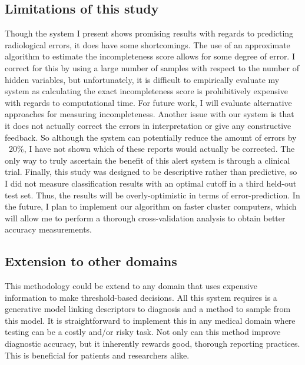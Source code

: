 \subsection{Limitations of this study}
Though the system I present shows promising results with regards to predicting radiological errors, it does have some shortcomings. The use of an approximate algorithm to estimate the incompleteness score allows for some degree of error. I correct for this by using a large number of samples with respect to the number of hidden variables, but unfortunately, it is difficult to empirically evaluate my system as calculating the exact incompleteness score is prohibitively expensive with regards to computational time. For future work, I will evaluate alternative approaches for measuring incompleteness. Another issue with our system is that it does not actually correct the errors in interpretation or give any constructive feedback. So although the system can potentially reduce the amount of errors by  ~20\%, I have not shown which of these reports would actually be corrected. The only way to truly ascertain the benefit of this alert system is through a clinical trial. Finally, this study was designed to be descriptive rather than predictive, so I did not measure classification results with an optimal cutoff in a third held-out test set. Thus, the results will be overly-optimistic in terms of error-prediction. In the future, I plan to implement our algorithm on faster cluster computers, which will allow me to perform a thorough cross-validation analysis to obtain better accuracy measurements. 

\subsection{Extension to other domains}
This methodology could be extend to any domain that uses expensive information to make threshold-based decisions. All this system requires is a generative model linking descriptors to diagnosis and a method to sample from this model. It is straightforward to implement this in any medical domain where testing can be a costly and/or risky task. Not only can this method improve diagnostic accuracy, but it inherently rewards good, thorough reporting practices. This is beneficial for patients and researchers alike.
